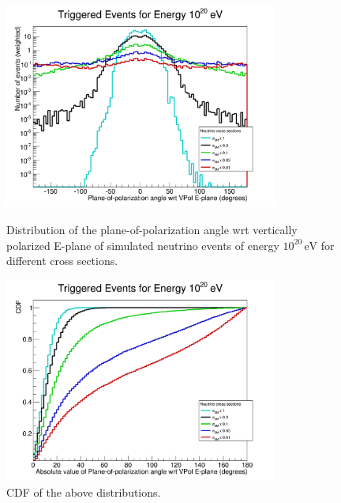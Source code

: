 \begin{figure}
\centering
\includegraphics[width=0.8\textwidth]{figures/Balloon_polangle20.png}
\caption{Distribution of the plane-of-polarization angle wrt vertically polarized E-plane of simulated neutrino events of energy $10^{20}\,\mbox{eV}$ for different cross sections.}
\label{polangle20}
\includegraphics[width=0.8\textwidth]{figures/Balloon_cdf_polangle20.png}
\caption{CDF of the above distributions.}
\label{polangle20_cdf}
\end{figure}


